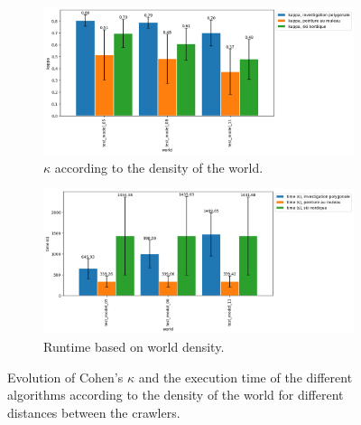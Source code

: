\documentclass[english,RandD]{rapportPFE}  %
\begin{document}
			\begin{figure}[h!]
				\begin{subfigure}[t]{0.9\linewidth}
					\includegraphics[width=\linewidth]{graphics/investigation_polygonale-peinture_au_rouleau_ski_nordique-kappa_for_each_world_vs_investigation_polygonale-kappa_for_each_world.png}
					\caption{$\kappa$ according to the density of the world.}
					\label{fig:investigation_polygonale-peinture_au_rouleau_ski_nordique-kappa_for_each_world_vs_investigation_polygonale-kappa_for_each_d}
				\end{subfigure}
				\hfill
				\begin{subfigure}[t]{0.9\linewidth}
					\includegraphics[width=\linewidth]{graphics/investigation_polygonale-peinture_au_rouleau_ski_nordique-time_for_each_world_vs_investigation_polygonale-time_for_each_world.png}
					\caption{Runtime based on world density.}
					\label{fig:investigation_polygonale-peinture_au_rouleau_ski_nordique-time_for_each_world_vs_investigation_polygonale-time_for_each_d}
				\end{subfigure}
				\caption{Evolution of Cohen's $\kappa$ and the execution time of the different algorithms according to the density of the world for different distances between the crawlers.}
				\label{fig:investigation_polygonale-peinture_au_rouleau_ski_nordique_for_each_world}
			\end{figure}
\end{document}
